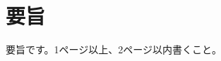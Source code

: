 \documentclass[main.tex]{subfiles}
\begin{document}
\section*{要旨}

要旨です。1ページ以上、2ページ以内書くこと。
\end{document}
